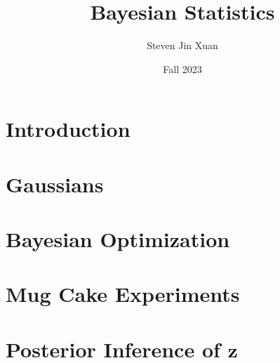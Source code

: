 \documentclass{article}[10, letterpaper]
\author{Steven Jin Xuan}
\date{Fall 2023}
\title{Bayesian Statistics}
\begin{document}

\section{Introduction}

\section{Gaussians}



\section{Bayesian Optimization}


\section{Mug Cake Experiments}

\section{Posterior Inference of $\mathbf{z}$}


{}

\end{document}
